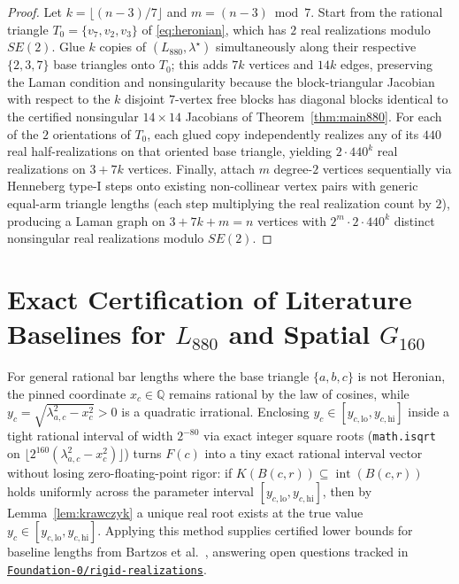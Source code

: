 \documentclass[11pt,a4paper]{article}
\theoremstyle{definition}
\theoremstyle{remark}
\begin{document}
\begin{proof}
Let $k = \lfloor (n-3)/7 \rfloor$ and $m = (n-3) \bmod 7$. Start from the rational triangle $T_0 = \{v_7, v_2, v_3\}$ of \eqref{eq:heronian}, which has $2$ real realizations modulo $SE(2)$. Glue $k$ copies of $(L_{880}, \lambda^\star)$ simultaneously along their respective $\{2,3,7\}$ base triangles onto $T_0$; this adds $7k$ vertices and $14k$ edges, preserving the Laman condition and nonsingularity because the block-triangular Jacobian with respect to the $k$ disjoint $7$-vertex free blocks has diagonal blocks identical to the certified nonsingular $14 \times 14$ Jacobians of Theorem~\ref{thm:main880}. For each of the $2$ orientations of $T_0$, each glued copy independently realizes any of its $440$ real half-realizations on that oriented base triangle, yielding $2 \cdot 440^k$ real realizations on $3 + 7k$ vertices. Finally, attach $m$ degree-$2$ vertices sequentially via Henneberg type-I steps onto existing non-collinear vertex pairs with generic equal-arm triangle lengths (each step multiplying the real realization count by $2$), producing a Laman graph on $3 + 7k + m = n$ vertices with $2^m \cdot 2 \cdot 440^k$ distinct nonsingular real realizations modulo $SE(2)$.
\end{proof}

\section{Exact Certification of Literature Baselines for \texorpdfstring{$L_{880}$}{L880} and Spatial \texorpdfstring{$G_{160}$}{G160}}

For general rational bar lengths where the base triangle $\{a,b,c\}$ is not Heronian, the pinned coordinate $x_c \in \mathbb{Q}$ remains rational by the law of cosines, while $y_c = \sqrt{\lambda_{a,c}^2 - x_c^2} > 0$ is a quadratic irrational. Enclosing $y_c \in [y_{c,\mathrm{lo}}, y_{c,\mathrm{hi}}]$ inside a tight rational interval of width $2^{-80}$ via exact integer square roots (\texttt{math.isqrt} on $\lfloor 2^{160}(\lambda_{a,c}^2 - x_c^2) \rfloor$) turns $F(c)$ into a tiny exact rational interval vector without losing zero-floating-point rigor: if $K(B(c,r)) \subseteq \operatorname{int}(B(c,r))$ holds uniformly across the parameter interval $[y_{c,\mathrm{lo}}, y_{c,\mathrm{hi}}]$, then by Lemma~\ref{lem:krawczyk} a unique real root exists at the true value $y_c \in [y_{c,\mathrm{lo}}, y_{c,\mathrm{hi}}]$. Applying this method supplies certified lower bounds for baseline lengths from Bartzos et al.\ \cite{BELT18}, answering open questions tracked in \href{https://github.com/Foundation-0/rigid-realizations}{\texttt{Foundation-0/rigid-realizations}}.
\end{document}
